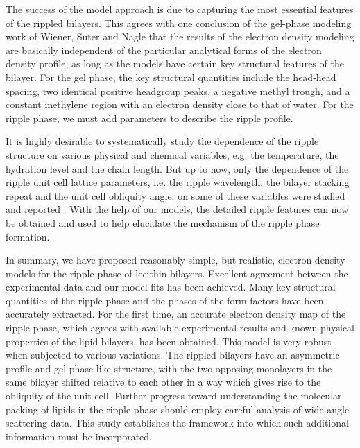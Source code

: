 The success of the model approach is due to capturing
the most essential features of the rippled bilayers. 
This agrees with one conclusion
of the gel-phase modeling work of Wiener, Suter and Nagle \cite{WSN89} 
that the results of the electron density modeling are basically independent 
of the particular analytical forms of the electron density profile, as long
as the models have certain key structural features of the bilayer. 
For the gel phase, the key structural quantities include 
the head-head spacing, two identical positive headgroup peaks, a negative
methyl trough, and a constant methylene region with an electron 
density close to that of water. For the ripple phase, we must add parameters
to describe the ripple profile.

It is highly desirable to systematically study the dependence of
the ripple structure on various physical and chemical variables,
e.g. the temperature, the hydration level and the chain length.
But up to now, only the dependence of the ripple unit cell
lattice parameters, i.e. the ripple wavelength, the bilayer stacking
repeat and the unit cell obliquity angle, on some of these variables
were studied and reported \cite{Wac89a,Matu90,Cev91}. With the help
of our models, the detailed ripple features can now be obtained and used
to help elucidate the mechanism of the ripple phase formation. 

In summary, we have proposed reasonably simple, but realistic, electron density 
models for the ripple phase of lecithin bilayers. Excellent agreement 
between the experimental data and our model fits has been
achieved. Many key structural
quantities of the ripple phase and the phases of the form factors
have been accurately extracted. For the first time, an accurate electron 
density map of the ripple phase, which agrees with available experimental 
results and known physical properties of the lipid bilayers, has been obtained. 
This model is very robust when subjected to various variations. 
The rippled bilayers have an asymmetric profile and gel-phase like structure, 
with the two opposing monolayers in the same bilayer shifted relative to 
each other in a way which gives rise to the obliquity of the unit cell. 
Further progress toward understanding the molecular packing of lipids in the 
ripple phase should employ careful analysis of wide angle scattering data.
This study establishes the framework into which such additional information
must be incorporated.

